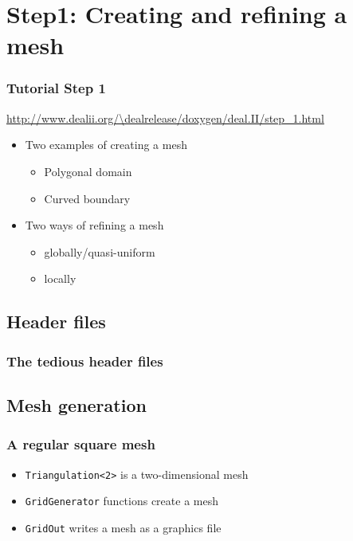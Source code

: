 
\section[Step1]{Step1: Creating and refining a mesh}

\begin{frame}
  \frametitle{Tutorial Step 1}
  {\footnotesize{\url{http://www.dealii.org/\dealrelease/doxygen/deal.II/step_1.html}}}
  \begin{itemize}
  \item Two examples of creating a mesh
    \begin{itemize}
    \item Polygonal domain
    \item Curved boundary
    \end{itemize}
  \item Two ways of refining a mesh
    \begin{itemize}
    \item globally/quasi-uniform
    \item locally
    \end{itemize}
  \end{itemize}
\end{frame}

\subsection{Header files}
\begin{frame}
  \frametitle{The tedious header files}
  \begin{block}{}
      
  \end{block}
\end{frame}

\subsection{Mesh generation}
\begin{frame}
  \frametitle{A regular square mesh}
  \begin{block}{}
        
  \end{block}

  \begin{itemize}
  \item \lstinline!Triangulation<2>! is a two-dimensional mesh
  \item \lstinline!GridGenerator! functions create a mesh
  \item \lstinline!GridOut! writes a mesh as a graphics file
  \end{itemize}
\end{frame}

